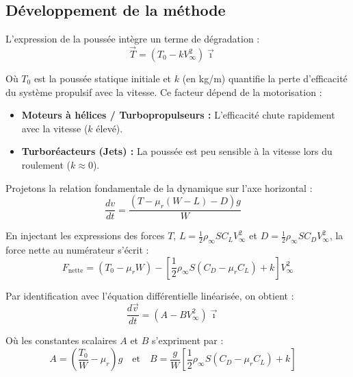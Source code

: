 				\subsection{Développement de la méthode}
				L'expression de la poussée intègre un terme de dégradation  :
				\begin{equation}
					\vec{T} = (T_0 - kV_\infty^2)\vec{\imath} \quad 
				\end{equation}
				
				Où $T_0$ est la poussée statique initiale et $k$ (en kg/m) quantifie la perte d'efficacité du système propulsif avec la vitesse. Ce facteur dépend de la motorisation :
				\begin{itemize}
					\item \textbf{Moteurs à hélices / Turbopropulseurs :} L'efficacité chute rapidement avec la vitesse ($k$ élevé).
					\item \textbf{Turboréacteurs (Jets) :} La poussée est peu sensible à la vitesse lors du roulement ($k \approx 0$).
				\end{itemize}
				
				Projetons la relation fondamentale de la dynamique sur l'axe horizontal :
				\begin{equation}
					\frac{dv}{dt} = \frac{(T - \mu_r(W - L) - D) g}{W} \quad 
				\end{equation}
				
				En injectant les expressions des forces $T$, $L = \frac{1}{2}\rho_\infty S C_L V_\infty^2$ et $D = \frac{1}{2}\rho_\infty S C_D V_\infty^2$, la force nette au numérateur s'écrit :
				\begin{equation*}
					F_{\text{nette}} = (T_0 - \mu_rW) - \left[\frac{1}{2}\rho_\infty S(C_D - \mu_rC_L) + k\right]V_\infty^2
				\end{equation*}
				
				Par identification avec l'équation différentielle linéarisée, on obtient :
				\begin{equation}
					\frac{d\vec{v}}{dt} = (A - BV_\infty^2)\vec{\imath} \quad 
				\end{equation}
				
				Où les constantes scalaires $A$ et $B$ s'expriment par :
				\begin{equation}
					A = \left(\frac{T_0}{W} - \mu_r\right)g \quad \text{et} \quad B = \frac{g}{W}\left[\frac{1}{2}\rho_\infty S(C_D - \mu_rC_L) + k\right] \quad 
				\end{equation}
				
		


